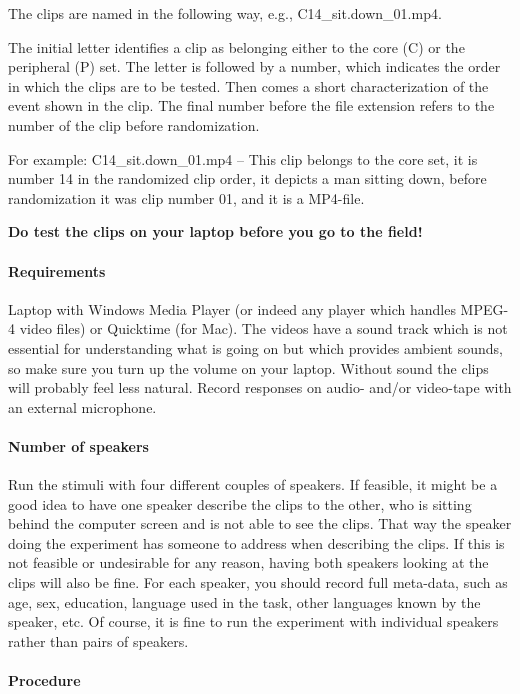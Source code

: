 The clips are named in the following way, e.g., C14\_sit.down\_01.mp4.

The initial letter identifies a clip as belonging either to the core (C) or the peripheral (P) set. The letter is followed by a number, which indicates the order in which the clips are to be tested. Then comes a short characterization of the event shown in the clip. The final number before the file extension refers to the number of the clip before randomization.

For example: C14\_sit.down\_01.mp4 -- This clip belongs to the core set, it is number 14 in the randomized clip order, it depicts a man sitting down, before randomization it was clip number 01, and it is a MP4-file.

{\bfseries Do test the clips on your laptop before you go to the field!}

\paragraph{Requirements}

Laptop with Windows Media Player (or indeed any play\-er which handles MPEG-4 video files) or Quicktime (for Mac). The videos have a sound track which is not essential for understanding what is going on but which provides ambient sounds, so make sure you turn up the volume on your laptop. Without sound the clips will probably feel less natural. Record responses on audio- and/or video-tape with an external microphone.

\paragraph{Number of speakers}

Run the stimuli with four different couples of speakers. If feasible, it might be a good idea to have one speaker describe the clips to the other, who is sitting behind the computer screen and is not able to see the clips. That way the speaker doing the experiment has someone to address when describing the clips. If this is not feasible or undesirable for any reason, having both speakers looking at the clips will also be fine. For each speaker, you should record full meta-data, such as age, sex, education, language used in the task, other languages known by the speaker, etc. Of course, it is fine to run the experiment with individual speakers rather than pairs of speakers.

\paragraph{Procedure}

